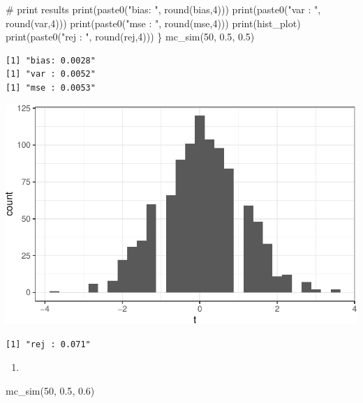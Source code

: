 \documentclass[
  letterpaper,
  DIV=11,
  numbers=noendperiod]{scrreprt}
\newenvironment{Shaded}{\begin{snugshade}}{\end{snugshade}}
\newcommand{\CommentTok}[1]{\textcolor[rgb]{0.37,0.37,0.37}{#1}}
\newcommand{\DecValTok}[1]{\textcolor[rgb]{0.68,0.00,0.00}{#1}}
\newcommand{\FloatTok}[1]{\textcolor[rgb]{0.68,0.00,0.00}{#1}}
\newcommand{\FunctionTok}[1]{\textcolor[rgb]{0.28,0.35,0.67}{#1}}
\newcommand{\NormalTok}[1]{\textcolor[rgb]{0.00,0.23,0.31}{#1}}
\newcommand{\StringTok}[1]{\textcolor[rgb]{0.13,0.47,0.30}{#1}}
\providecommand{\tightlist}{%
  \setlength{\itemsep}{0pt}\setlength{\parskip}{0pt}}\usepackage{longtable,booktabs,array}
\begin{document}
\begin{Shaded}
\begin{Highlighting}[]
  \CommentTok{\# print results}
  \FunctionTok{print}\NormalTok{(}\FunctionTok{paste0}\NormalTok{(}\StringTok{"bias: "}\NormalTok{, }\FunctionTok{round}\NormalTok{(bias,}\DecValTok{4}\NormalTok{)))}
  \FunctionTok{print}\NormalTok{(}\FunctionTok{paste0}\NormalTok{(}\StringTok{"var : "}\NormalTok{, }\FunctionTok{round}\NormalTok{(var,}\DecValTok{4}\NormalTok{)))}
  \FunctionTok{print}\NormalTok{(}\FunctionTok{paste0}\NormalTok{(}\StringTok{"mse : "}\NormalTok{, }\FunctionTok{round}\NormalTok{(mse,}\DecValTok{4}\NormalTok{)))}
  \FunctionTok{print}\NormalTok{(hist\_plot)}
  \FunctionTok{print}\NormalTok{(}\FunctionTok{paste0}\NormalTok{(}\StringTok{"rej : "}\NormalTok{, }\FunctionTok{round}\NormalTok{(rej,}\DecValTok{4}\NormalTok{)))}
\NormalTok{\}}
\FunctionTok{mc\_sim}\NormalTok{(}\DecValTok{50}\NormalTok{, }\FloatTok{0.5}\NormalTok{, }\FloatTok{0.5}\NormalTok{)}
\end{Highlighting}
\end{Shaded}

\begin{verbatim}
[1] "bias: 0.0028"
[1] "var : 0.0052"
[1] "mse : 0.0053"
\end{verbatim}

\includegraphics{07-inference_files/figure-pdf/unnamed-chunk-11-1.pdf}

\begin{verbatim}
[1] "rej : 0.071"
\end{verbatim}

\begin{enumerate}
\def\labelenumi{\arabic{enumi}.}
\setcounter{enumi}{4}
\tightlist
\item
\end{enumerate}

\begin{Shaded}
\begin{Highlighting}[]
\FunctionTok{mc\_sim}\NormalTok{(}\DecValTok{50}\NormalTok{, }\FloatTok{0.5}\NormalTok{, }\FloatTok{0.6}\NormalTok{)}
\end{Highlighting}
\end{Shaded}
\end{document}

